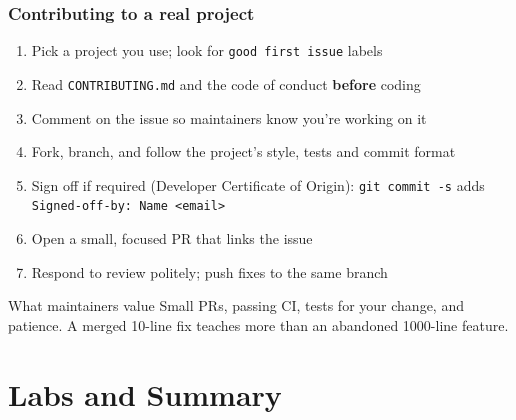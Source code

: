 \documentclass[aspectratio=169,10pt,compress]{beamer}
\newcommand{\cmd}[1]{\texttt{\color{gitred}#1}}
\begin{document}
\begin{frame}[t,fragile] \frametitle{Contributing to a real project}
  \begin{enumerate}
    \item Pick a project you use; look for \texttt{good first issue} labels
    \item Read \texttt{CONTRIBUTING.md} and the code of conduct \textbf{before} coding
    \item Comment on the issue so maintainers know you're working on it
    \item Fork, branch, and follow the project's style, tests and commit format
    \item Sign off if required (Developer Certificate of Origin):
          \cmd{git commit -s} adds \texttt{Signed-off-by: Name <email>}
    \item Open a small, focused PR that links the issue
    \item Respond to review politely; push fixes to the same branch
  \end{enumerate}

  \begin{block}{What maintainers value}
    Small PRs, passing CI, tests for your change, and patience.
    A merged 10-line fix teaches more than an abandoned 1000-line feature.
  \end{block}
\end{frame}

\section[Labs]{Labs and Summary}
\end{document}
